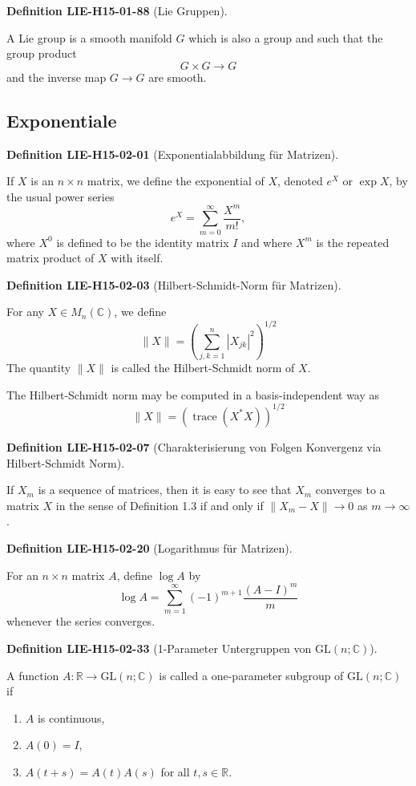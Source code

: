 \documentclass[10pt, letterpaper]{article}
\newcommand{\C}{\mathbb{C}}
\newcommand{\GL}{\mathrm{GL}}
\newcommand{\CustomHeading}[3]{%
  \par\medskip\noindent%
  \textbf{#1 #2} \textnormal{(#3)}.\enskip%
}
\newenvironment{DEF}[2]{\CustomHeading{Definition}{#1}{#2}}{}
\begin{document}
\begin{DEF}{LIE-H15-01-88}{Lie Gruppen}
A Lie group is a smooth manifold $G$ which is also a group and such that the group product
$$
G \times G \rightarrow G
$$
and the inverse map $G \rightarrow G$ are smooth.
\end{DEF}

\subsection{Exponentiale}

\begin{DEF}{LIE-H15-02-01}{Exponentialabbildung für Matrizen}
If $X$ is an $n \times n$ matrix, we define the exponential of $X$, denoted $e^{X}$ or $\exp X$, by the usual power series
$$
e^{X}=\sum_{m=0}^{\infty} \frac{X^{m}}{m!},
$$
where $X^{0}$ is defined to be the identity matrix $I$ and where $X^{m}$ is the repeated matrix product of $X$ with itself.
\end{DEF}

\begin{DEF}{LIE-H15-02-03}{Hilbert-Schmidt-Norm für Matrizen}
For any $X \in M_{n}(\mathbb{C})$, we define
$$
\|X\|=\left(\sum_{j, k=1}^{n}\left|X_{j k}\right|^{2}\right)^{1 / 2}
$$
The quantity $\|X\|$ is called the Hilbert-Schmidt norm of $X$.

The Hilbert-Schmidt norm may be computed in a basis-independent way as
$$
\|X\|=\left(\operatorname{trace}\left(X^{*} X\right)\right)^{1 / 2}
$$
\end{DEF}

\begin{DEF}{LIE-H15-02-07}{Charakterisierung von Folgen Konvergenz via Hilbert-Schmidt Norm}
If $X_{m}$ is a sequence of matrices, then it is easy to see that $X_{m}$ converges to a matrix $X$ in the sense of Definition 1.3 if and only if $\left\|X_{m}-X\right\| \rightarrow 0$ as $m \rightarrow \infty$.
\end{DEF}

\begin{DEF}{LIE-H15-02-20}{Logarithmus für Matrizen}
For an $n \times n$ matrix $A$, define $\log A$ by
$$
\log A=\sum_{m=1}^{\infty}(-1)^{m+1} \frac{(A-I)^{m}}{m}
$$
whenever the series converges.
\end{DEF}

\begin{DEF}{LIE-H15-02-33}{1-Parameter Untergruppen von $\GL(n;\C)$}
A function $A: \mathbb{R} \rightarrow \mathrm{GL}(n ; \mathbb{C})$ is called a one-parameter subgroup of $\mathrm{GL}(n ; \mathbb{C})$ if
\begin{enumerate}
  \item $A$ is continuous,
  \item $A(0)=I$,
  \item $A(t+s)=A(t) A(s)$ for all $t, s \in \mathbb{R}$.
\end{enumerate}
\end{DEF}
\end{document}
